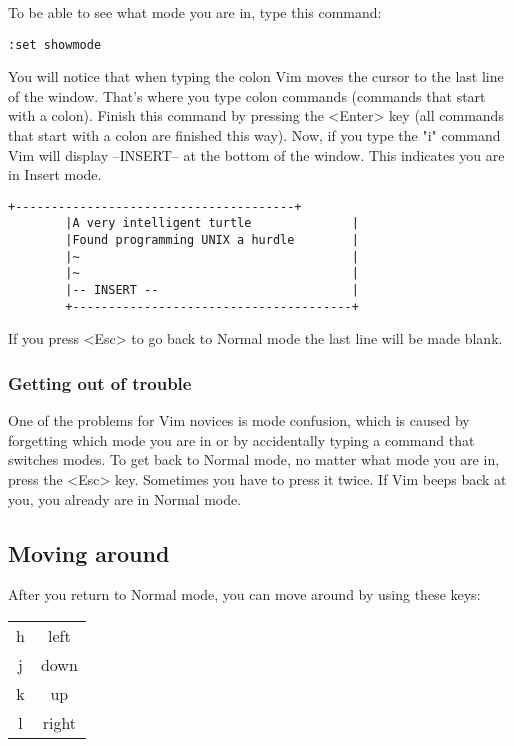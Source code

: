 To be able to see what mode you are in, type this command:

 \begin{Verbatim}[samepage=true]
 :set showmode
 \end{Verbatim}

You will notice that when typing the colon Vim moves the cursor to the last line of the window.
That's where you type colon commands (commands that start with a colon).
Finish this command by pressing the <Enter> key (all commands that start with a colon are finished this way).
Now, if you type the "i" command Vim will display --INSERT-- at the bottom of the window.
This indicates you are in Insert mode.

		\begin{Verbatim}[samepage=true]
		+---------------------------------------+
		|A very intelligent turtle              |
		|Found programming UNIX a hurdle        |
		|~                                      |
		|~                                      |
		|-- INSERT --                           |
		+---------------------------------------+
		\end{Verbatim}

If you press <Esc> to go back to Normal mode the last line will be made blank.

\subsubsection{Getting out of trouble}

One of the problems for Vim novices is mode confusion, which is caused by forgetting which mode you are in or by accidentally typing a command that switches modes.
To get back to Normal mode, no matter what mode you are in, press the <Esc> key.
Sometimes you have to press it twice.
If Vim beeps back at you, you already are in Normal mode.

\subsection{Moving around}

After you return to Normal mode, you can move around by using these keys:
\label{hjlk}
\begin{center}
				\begin{tabular}{c|c} 
								h & left\\
								j & down\\
								k & up\\
								l & right
				\end{tabular}
\end{center}

